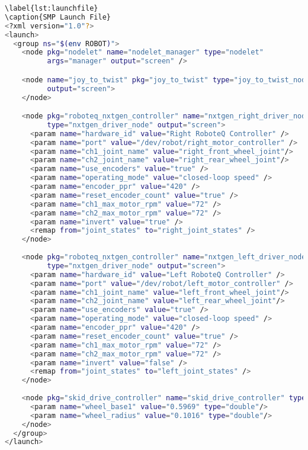 \begin{lstlisting}[language=bash]
\label{lst:launchfile}
\caption{SMP Launch File}
<?xml version="1.0"?>
<launch>
  <group ns="$(env ROBOT)">
    <node pkg="nodelet" name="nodelet_manager" type="nodelet"
          args="manager" output="screen" />

    <node name="joy_to_twist" pkg="joy_to_twist" type="joy_to_twist_node"
          output="screen">
    </node>

    <node pkg="roboteq_nxtgen_controller" name="nxtgen_right_driver_node"
          type="nxtgen_driver_node" output="screen">
      <param name="hardware_id" value="Right RoboteQ Controller" />
      <param name="port" value="/dev/robot/right_motor_controller" />
      <param name="ch1_joint_name" value="right_front_wheel_joint"/>
      <param name="ch2_joint_name" value="right_rear_wheel_joint"/>
      <param name="use_encoders" value="true" />
      <param name="operating_mode" value="closed-loop speed" />
      <param name="encoder_ppr" value="420" />
      <param name="reset_encoder_count" value="true" />
      <param name="ch1_max_motor_rpm" value="72" />
      <param name="ch2_max_motor_rpm" value="72" />
      <param name="invert" value="true" />
      <remap from="joint_states" to="right_joint_states" />
    </node>
 
    <node pkg="roboteq_nxtgen_controller" name="nxtgen_left_driver_node"
          type="nxtgen_driver_node" output="screen">
      <param name="hardware_id" value="Left RoboteQ Controller" />
      <param name="port" value="/dev/robot/left_motor_controller" />
      <param name="ch1_joint_name" value="left_front_wheel_joint"/>
      <param name="ch2_joint_name" value="left_rear_wheel_joint"/>
      <param name="use_encoders" value="true" />
      <param name="operating_mode" value="closed-loop speed" />
      <param name="encoder_ppr" value="420" />
      <param name="reset_encoder_count" value="true" />
      <param name="ch1_max_motor_rpm" value="72" />
      <param name="ch2_max_motor_rpm" value="72" />
      <param name="invert" value="false" />
      <remap from="joint_states" to="left_joint_states" />
    </node>
    
    <node pkg="skid_drive_controller" name="skid_drive_controller" type="base_controller_node" output="screen">
      <param name="wheel_base1" value="0.5969" type="double"/>
      <param name="wheel_radius" value="0.1016" type="double"/>
    </node>	
  </group>
</launch>
\end{lstlisting}

